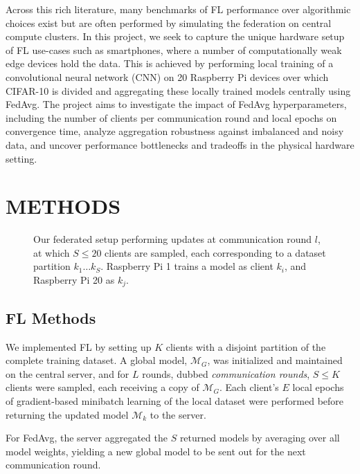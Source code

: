 \documentclass{article}
\begin{document}
Across this rich literature, many benchmarks of FL performance over algorithmic choices exist but are often performed by simulating the federation on central compute clusters.
In this project, we seek to capture the unique hardware setup of FL use-cases such as smartphones, where a number of computationally weak edge devices hold the data.
This is achieved by performing local training of a convolutional neural network (CNN) on 20 Raspberry Pi devices over which CIFAR-10 \cite{alex2009learning} is divided and aggregating these locally trained models centrally using FedAvg.
The project aims to investigate the impact of FedAvg hyperparameters, including the number of clients per communication round and local epochs on convergence time, analyze aggregation robustness against imbalanced and noisy data, and uncover performance bottlenecks and tradeoffs in the physical hardware setting.

\section{METHODS}%
\label{sec:methods}

\begin{figure}[ht!]
    \centering
    
    \caption{
        Our federated setup performing updates at communication round $l$, at which $S\leq 20$ clients are sampled, each corresponding to a dataset partition $k_1\ldots k_{S}$.
        Raspberry Pi 1 trains a model as client $k_i$, and Raspberry Pi 20 as $k_j$.
    }
    \label{fig:setup}
\end{figure}\noindent

\subsection{FL Methods}
We implemented FL by setting up $K$ clients with a disjoint partition of the complete training dataset.
A global model, $\mathcal M_G$, was initialized and maintained on the central server, and for $L$ rounds, dubbed \emph{communication rounds}, $S \leq K$ clients were sampled, each receiving a copy of $\mathcal M_G$.
Each client's $E$ local epochs of gradient-based minibatch learning of the local dataset were performed before returning the updated model $\mathcal M_k$ to the server.

For FedAvg, the server aggregated the $S$ returned models by averaging over all model weights, yielding a new global model to be sent out for the next communication round.
\end{document}
